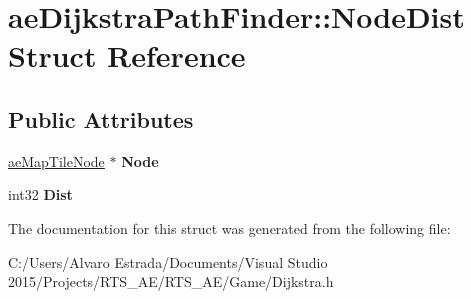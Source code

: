 \hypertarget{structae_dijkstra_path_finder_1_1_node_dist}{}\section{ae\+Dijkstra\+Path\+Finder\+:\+:Node\+Dist Struct Reference}
\label{structae_dijkstra_path_finder_1_1_node_dist}
\subsection*{Public Attributes}
\begin{DoxyCompactItemize}
\item 
\hyperlink{classae_map_tile_node}{ae\+Map\+Tile\+Node} $\ast$ {\bfseries Node}\hypertarget{structae_dijkstra_path_finder_1_1_node_dist_a8f100e40156613cc8f13c523457e7afb}{}\label{structae_dijkstra_path_finder_1_1_node_dist_a8f100e40156613cc8f13c523457e7afb}

\item 
int32 {\bfseries Dist}\hypertarget{structae_dijkstra_path_finder_1_1_node_dist_a2bf442c8b68dcca3a9066063779ab57b}{}\label{structae_dijkstra_path_finder_1_1_node_dist_a2bf442c8b68dcca3a9066063779ab57b}

\end{DoxyCompactItemize}


The documentation for this struct was generated from the following file\+:\begin{DoxyCompactItemize}
\item 
C\+:/\+Users/\+Alvaro Estrada/\+Documents/\+Visual Studio 2015/\+Projects/\+R\+T\+S\+\_\+\+A\+E/\+R\+T\+S\+\_\+\+A\+E/\+Game/Dijkstra.\+h\end{DoxyCompactItemize}
